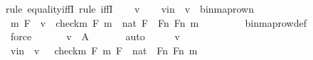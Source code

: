 \begin{isabellebody}
%
\isadelimproof
\isanewline
%
\endisadelimproof
%
\isatagproof
{}\isamarkupfalse%
{\isacharparenleft}{\kern0pt}rule\ equality{\isacharunderscore}{\kern0pt}iffI{\isacharcomma}{\kern0pt}\ rule\ iffI{\isacharparenright}{\kern0pt}\isanewline
\ \ \isamarkupfalse%
\ v\isanewline
\ \ \isamarkupfalse%
\ vin\ {\isacharcolon}{\kern0pt}\ {\isachardoublequoteopen}v\ {\isasymin}\ binmap{\isacharunderscore}{\kern0pt}row{\isacharprime}{\kern0pt}{\isacharparenleft}{\kern0pt}n{\isacharparenright}{\kern0pt}{\isachardoublequoteclose}\ \isanewline
\ \ \isamarkupfalse%
\ \isamarkupfalse%
\ m\ F\ \ {\isachardoublequoteopen}v\ {\isacharequal}{\kern0pt}\ {\isacharless}{\kern0pt}check{\isacharparenleft}{\kern0pt}m{\isacharparenright}{\kern0pt}{\isacharcomma}{\kern0pt}\ F{\isachargreater}{\kern0pt}{\isachardoublequoteclose}\ {\isachardoublequoteopen}m\ {\isasymin}\ nat{\isachardoublequoteclose}\ {\isachardoublequoteopen}F\ {\isasymin}\ Fn{\isachardoublequoteclose}\ {\isachardoublequoteopen}F{\isacharbackquote}{\kern0pt}{\isacharless}{\kern0pt}n{\isacharcomma}{\kern0pt}\ m{\isachargreater}{\kern0pt}\ {\isacharequal}{\kern0pt}\ {}{\isachardoublequoteclose}\ \isanewline
\ \ \ \ \isamarkupfalse%
\ binmap{\isacharunderscore}{\kern0pt}row{\isacharprime}{\kern0pt}{\isacharunderscore}{\kern0pt}def\ \isanewline
\ \ \ \ \isamarkupfalse%
\ force\ \isanewline
\ \ \isamarkupfalse%
\ \isamarkupfalse%
\ {\isachardoublequoteopen}v\ {\isasymin}\ {\isacharquery}{\kern0pt}A{\isachardoublequoteclose}\ \isanewline
\ \ \ \ \isamarkupfalse%
\ auto\isanewline
{}\isamarkupfalse%
\ \isanewline
\ \ \isamarkupfalse%
\ v\ \isanewline
\ \ \isamarkupfalse%
\ vin\ {\isacharcolon}{\kern0pt}\ {\isachardoublequoteopen}v\ {\isasymin}\ {\isacharbraceleft}{\kern0pt}\ {\isacharless}{\kern0pt}check{\isacharparenleft}{\kern0pt}m{\isacharparenright}{\kern0pt}{\isacharcomma}{\kern0pt}\ F{\isachargreater}{\kern0pt}{\isachardot}{\kern0pt}{\isachardot}{\kern0pt}\ {\isacharless}{\kern0pt}m{\isacharcomma}{\kern0pt}\ F{\isachargreater}{\kern0pt}\ {\isasymin}\ nat\ {\isasymtimes}\ Fn{\isacharcomma}{\kern0pt}\ F{\isacharbackquote}{\kern0pt}{\isacharless}{\kern0pt}n{\isacharcomma}{\kern0pt}\ m{\isachargreater}{\kern0pt}\ {\isacharequal}{\kern0pt}\ {}\ {\isacharbraceright}{\kern0pt}{\isachardoublequoteclose}\ \isanewline
\ \ \isamarkupfalse%
\ \isamarkupfalse%

\end{isabellebody}
